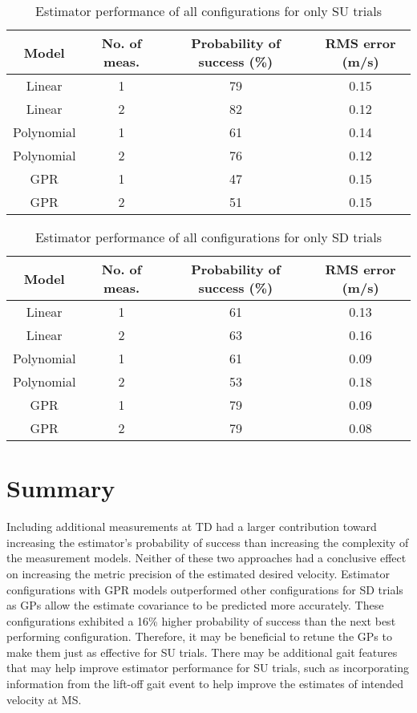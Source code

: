 \begin{table} %
	\centering
	\caption{Estimator performance of all configurations for only SU trials} \label{table:su}
	\begin{tabular}{|c|c|c|c|}
		\hline
		Model & No. of meas. & Probability of success (\%) & RMS error (m/s)\\
		\hline
		Linear & 1 & 79 & 0.15 \\
		\hline
		Linear & 2 & 82 & 0.12 \\
		\hline
		Polynomial & 1 & 61 & 0.14 \\
		\hline
		Polynomial & 2 & 76 & 0.12 \\
		\hline
		GPR & 1 & 47 & 0.15 \\
		\hline
		GPR & 2 & 51 & 0.15 \\
		\hline
	\end{tabular}
\end{table}

\begin{table} %
	\centering
	\caption{Estimator performance of all configurations for only SD trials} \label{table:sd}
	\begin{tabular}{|c|c|c|c|}
		\hline
		Model & No. of meas. & Probability of success (\%) & RMS error (m/s)\\
		\hline
		Linear & 1 & 61 & 0.13 \\
		\hline
		Linear & 2 & 63 & 0.16 \\
		\hline
		Polynomial & 1 & 61 & 0.09 \\
		\hline
		Polynomial & 2 & 53 & 0.18 \\
		\hline
		GPR & 1 & 79 & 0.09 \\
		\hline
		GPR & 2 & 79 & 0.08 \\
		\hline
	\end{tabular}
\end{table}

\section{Summary}

Including additional measurements at TD had a larger contribution toward increasing the estimator's probability of success than increasing the complexity of the measurement models. Neither of these two approaches had a conclusive effect on increasing the metric precision of the estimated desired velocity. Estimator configurations with GPR models outperformed other configurations for SD trials as GPs allow the estimate covariance to be predicted more accurately. These configurations exhibited a 16\% higher probability of success than the next best performing configuration. Therefore, it may be beneficial to retune the GPs to make them just as effective for SU trials. There may be additional gait features that may help improve estimator performance for SU trials, such as incorporating information from the lift-off gait event to help improve the estimates of intended velocity at MS.
